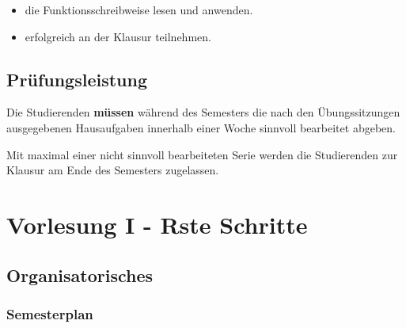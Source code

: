 \documentclass[
]{book}
\providecommand{\tightlist}{%
  \setlength{\itemsep}{0pt}\setlength{\parskip}{0pt}}
\begin{document}
\begin{itemize}
\tightlist
\item
  die Funktionsschreibweise lesen und anwenden.
\item
  erfolgreich an der Klausur teilnehmen.
\end{itemize}

\hypertarget{pruxfcfungsleistung}{%
\section{Prüfungsleistung}\label{pruxfcfungsleistung}}

Die Studierenden \textbf{müssen} während des Semesters die nach den Übungssitzungen ausgegebenen Hausaufgaben innerhalb einer Woche sinnvoll bearbeitet abgeben.

Mit maximal einer nicht sinnvoll bearbeiteten Serie werden die Studierenden zur Klausur am Ende des Semesters zugelassen.

\hypertarget{vorlesung-i---rste-schritte}{%
\chapter{Vorlesung I - Rste Schritte}\label{vorlesung-i---rste-schritte}}

\hypertarget{organisatorisches}{%
\section{Organisatorisches}\label{organisatorisches}}

\hypertarget{semesterplan-1}{%
\subsection*{Semesterplan}\label{semesterplan-1}}
\end{document}
